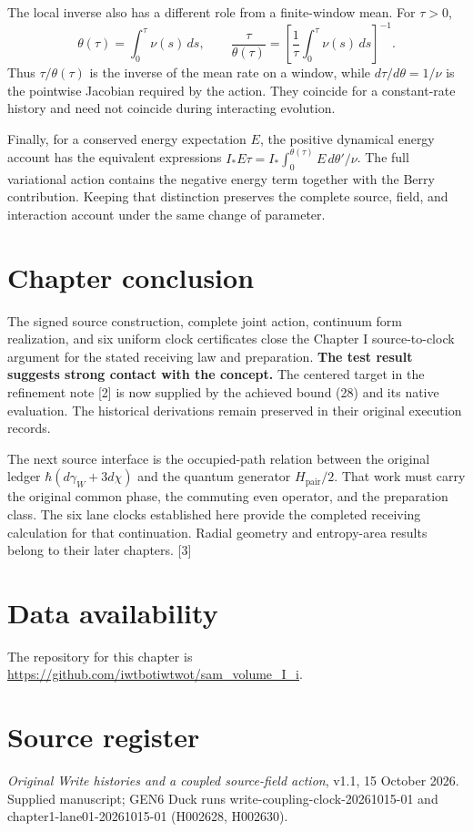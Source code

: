 \documentclass[10pt,twocolumn,letterpaper]{article}
\begin{document}
The local inverse also has a different role from a finite-window mean. For $\tau>0$,
\[
\theta(\tau)=\int_0^\tau\nu(s)\,ds,
\qquad
\frac{\tau}{\theta(\tau)}
=\left[\frac1\tau\int_0^\tau\nu(s)\,ds\right]^{-1}.
\]
Thus $\tau/\theta(\tau)$ is the inverse of the mean rate on a window, while $d\tau/d\theta=1/\nu$ is the pointwise Jacobian required by the action. They coincide for a constant-rate history and need not coincide during interacting evolution.

Finally, for a conserved energy expectation $E$, the positive dynamical energy account has the equivalent expressions $I_*E\tau=I_*\int_0^{\theta(\tau)}E\,d\theta'/\nu$. The full variational action contains the negative energy term together with the Berry contribution. Keeping that distinction preserves the complete source, field, and interaction account under the same change of parameter.


\section{Chapter conclusion}
The signed source construction, complete joint action, continuum form realization, and six uniform clock certificates close the Chapter I source-to-clock argument for the stated receiving law and preparation. \textbf{The test result suggests strong contact with the concept.} The centered target in the refinement note [2] is now supplied by the achieved bound (28) and its native evaluation. The historical derivations remain preserved in their original execution records.

The next source interface is the occupied-path relation between the original ledger $\hbar(d\gamma_W+3d\chi)$ and the quantum generator $H_{\mathrm{pair}}/2$. That work must carry the original common phase, the commuting even operator, and the preparation class. The six lane clocks established here provide the completed receiving calculation for that continuation. Radial geometry and entropy-area results belong to their later chapters. [3]


\section*{Data availability}
The repository for this chapter is \url{https://github.com/iwtbotiwtwot/sam_volume_I_i}.

\section*{Source register}
\begingroup\footnotesize
\noindent[1] \emph{Original Write histories and a coupled source-field action}, v1.1, 15 October 2026. Supplied manuscript; GEN6 Duck runs write-coupling-clock-20261015-01 and chapter1-lane01-20261015-01 (H002628, H002630).
\end{document}
